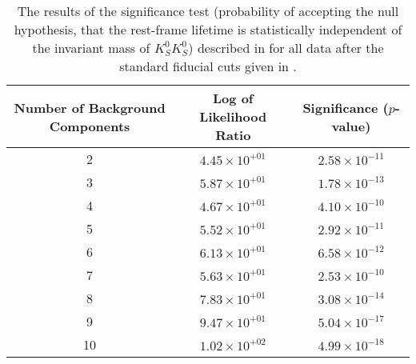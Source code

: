 \begin{table}[ht]
    \begin{center}
        \begin{tabular}{ccc}\toprule
            Number of Background Components & Log of Likelihood Ratio & Significance ($p$-value) \\\midrule
             2 & $4.45 \times 10^{+01}$ & $2.58 \times 10^{-11}$ \\
             3 & $5.87 \times 10^{+01}$ & $1.78 \times 10^{-13}$ \\
             4 & $4.67 \times 10^{+01}$ & $4.10 \times 10^{-10}$ \\
             5 & $5.52 \times 10^{+01}$ & $2.92 \times 10^{-11}$ \\
             6 & $6.13 \times 10^{+01}$ & $6.58 \times 10^{-12}$ \\
             7 & $5.63 \times 10^{+01}$ & $2.53 \times 10^{-10}$ \\
             8 & $7.83 \times 10^{+01}$ & $3.08 \times 10^{-14}$ \\
             9 & $9.47 \times 10^{+01}$ & $5.04 \times 10^{-17}$ \\
             10 & $1.02 \times 10^{+02}$ & $4.99 \times 10^{-18}$ \\\bottomrule
        \end{tabular}
        \caption{The results of the significance test (probability of accepting the null hypothesis, that the rest-frame lifetime is statistically independent of the invariant mass of $K_S^0K_S^0$) described in  for all data after the standard fiducial cuts given in .}\label{tab:independence-test}
    \end{center}
\end{table}